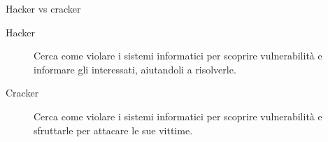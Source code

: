 \begin{myframe}{Hacker vs cracker}
  \pause
  \begin{description}
    \item[Hacker] Cerca come violare i sistemi informatici per scoprire vulnerabilità e \pause informare gli interessati, aiutandoli a risolverle.
    \pause
    \item[Cracker] Cerca come violare i sistemi informatici per scoprire vulnerabilità e \pause sfruttarle per attacare le sue vittime.
  \end{description}
\end{myframe}
